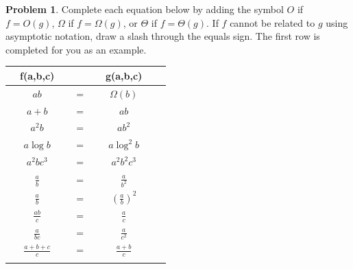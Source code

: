\documentclass[10pt]{article}
\theoremstyle{definition}
\newtheorem{problem}{Problem}
\begin{document}
\newpage
\begin{problem}
    Complete each equation below by adding the symbol $O$ if $f=O(g)$, $\Omega$ if $f=\Omega(g)$, or $\Theta$ if $f=\Theta(g)$.  
    If $f$ cannot be related to $g$ using asymptotic notation, draw a slash through the equals sign.
    The first row is completed for you as an example.

{\renewcommand{\arraystretch}{4.4}
\begin{tabular}{c c c c c c}
    & f(a,b,c) &~\hspace{0.5in}~$ $~\hspace{0.5in}~& g(a,b,c) &\\
    \hline
    & $ab$ & ~\hspace{0.5in}~$=$~\hspace{0.5in}~  & $\Omega(b)$ &  &\\
    \arrayrulecolor{gray}\hline
    & $a + b$ & ~\hspace{0.5in}~$=$~\hspace{0.5in}~  & $ab$ &  &\\
    \arrayrulecolor{gray}\hline
    & $a^2b$ & ~\hspace{0.5in}~$=$~\hspace{0.5in}~  & $ab^2$ &  &\\
    \arrayrulecolor{gray}\hline
    & $a\log b$ & ~\hspace{0.5in}~$=$~\hspace{0.5in}~  & $a \log^2 b$ &  &\\
    \arrayrulecolor{gray}\hline
    & $a^2bc^3$ & ~\hspace{0.5in}~$=$~\hspace{0.5in}~  & $a^2b^2c^3$ &  &\\
    \arrayrulecolor{gray}\hline
    & $\frac ab$ & ~\hspace{0.5in}~$=$~\hspace{0.5in}~  & $\frac a {b^2}$ &  &\\
    \arrayrulecolor{gray}\hline
    & $\frac ab$ & ~\hspace{0.5in}~$=$~\hspace{0.5in}~  & $(\frac a b)^2$ &  &\\
    \arrayrulecolor{gray}\hline
    & $\frac{ab}{c}$ & ~\hspace{0.5in}~$=$~\hspace{0.5in}~  & $\frac{a}{c}$ &  &\\
    \arrayrulecolor{gray}\hline
    & $\frac{a}{bc}$ & ~\hspace{0.5in}~$=$~\hspace{0.5in}~  & $\frac{a}{c^2}$ &  &\\
    \arrayrulecolor{gray}\hline
    & $\frac{a+b+c}{c}$ & ~\hspace{0.5in}~$=$~\hspace{0.5in}~  & $\frac{a+b}{c}$ &  &\\
    \arrayrulecolor{gray}\hline


\end{tabular}}
\end{problem}
\end{document}
